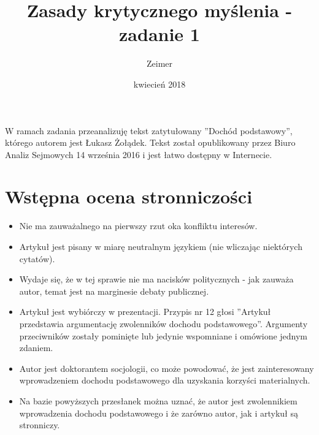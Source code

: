 \documentclass[11pt]{article}
\begin{document}
	\title{Zasady krytycznego myślenia - zadanie 1}
	\author{Zeimer}
	\date{kwiecień 2018}
	\maketitle
	
	\par W ramach zadania przeanalizuję tekst zatytułowany ''Dochód podstawowy'', którego autorem jest Łukasz Żołądek. Tekst został opublikowany przez Biuro Analiz Sejmowych 14 września 2016 i jest łatwo dostępny w Internecie.
	
	\section{Wstępna ocena stronniczości}
	\begin{itemize}
		\item Nie ma zauważalnego na pierwszy rzut oka konfliktu interesów.
		\item Artykuł jest pisany w miarę neutralnym językiem (nie wliczając niektórych cytatów).
		\item Wydaje się, że w tej sprawie nie ma nacisków politycznych - jak zauważa autor, temat jest na marginesie debaty publicznej.
		\item Artykuł jest wybiórczy w prezentacji. Przypis nr 12 głosi ''Artykuł przedstawia argumentację zwolenników dochodu podstawowego''. Argumenty przeciwników zostały pominięte lub jedynie wspomniane i omówione jednym zdaniem.
		\item Autor jest doktorantem socjologii, co może powodować, że jest zainteresowany wprowadzeniem dochodu podstawowego dla uzyskania korzyści materialnych.
		\item Na bazie powyższych przesłanek można uznać, że autor jest zwolennikiem wprowadzenia dochodu podstawowego i że zarówno autor, jak i artykuł są stronniczy.
	\end{itemize}
	
\end{document}
